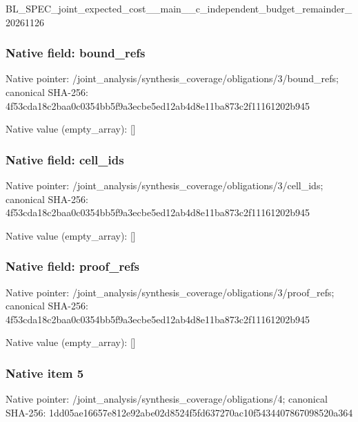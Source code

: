 \documentclass[10pt,a4paper]{article}
\begin{document}
BL\_SPEC\_joint\_expected\_c\allowbreak{}ost\_\_main\_\_c\_independent\allowbreak{}\_budget\_remainder\_202611\allowbreak{}26


\subsubsection{Native field: bound\_refs}


Native pointer: /joint\_analysis/synthesi\allowbreak{}s\_coverage/obligations/3\allowbreak{}/bound\_refs; canonical SHA-256: 4f53cda18c2baa0c0354bb5f\allowbreak{}9a3ecbe5ed12ab4d8e11ba87\allowbreak{}3c2f11161202b945



Native value (empty\_array): []



\subsubsection{Native field: cell\_ids}


Native pointer: /joint\_analysis/synthesi\allowbreak{}s\_coverage/obligations/3\allowbreak{}/cell\_ids; canonical SHA-256: 4f53cda18c2baa0c0354bb5f\allowbreak{}9a3ecbe5ed12ab4d8e11ba87\allowbreak{}3c2f11161202b945



Native value (empty\_array): []



\subsubsection{Native field: proof\_refs}


Native pointer: /joint\_analysis/synthesi\allowbreak{}s\_coverage/obligations/3\allowbreak{}/proof\_refs; canonical SHA-256: 4f53cda18c2baa0c0354bb5f\allowbreak{}9a3ecbe5ed12ab4d8e11ba87\allowbreak{}3c2f11161202b945



Native value (empty\_array): []



\subsubsection{Native item 5}


Native pointer: /joint\_analysis/synthesi\allowbreak{}s\_coverage/obligations/4; canonical SHA-256: 1dd05ae16657e812e92abe02\allowbreak{}d8524f5fd637270ac10f5434\allowbreak{}407867098520a364
\end{document}
